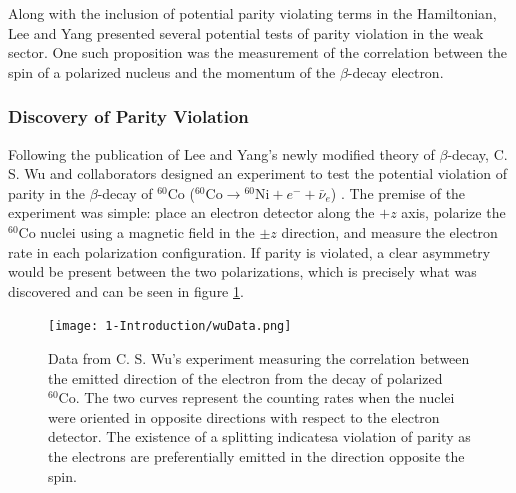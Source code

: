 Along with the inclusion of potential parity violating terms in the Hamiltonian, Lee and Yang
presented several potential tests of parity violation in the weak sector. One such proposition
was the measurement of the correlation between the spin of a polarized nucleus and
the momentum of the $\beta$-decay electron.

\subsubsection{Discovery of Parity Violation}

Following the publication of Lee and Yang's newly modified theory of $\beta$-decay, C. S. Wu
and collaborators designed an experiment to test the potential violation
of parity in the $\beta$-decay of $^{60}\mathrm{Co}$
($^{60}\mathrm{Co} \rightarrow {^{60}\mathrm{Ni}} + e^- + \bar{\nu}_e$) \cite{wu1957}. The premise of the experiment
was simple: place an electron detector along the $+z$ axis, polarize the $^{60}\mathrm{Co}$ nuclei
using a magnetic field in the $\pm z$ direction, and measure the electron rate in each polarization
configuration. If parity is violated, a clear asymmetry would be present between the two polarizations,
which is precisely what was discovered and can be seen in figure \ref{fig:wuData}.

\begin{figure}[h]
  \centering
  \texttt{[image: 1-Introduction/wuData.png]}  
  \caption{Data from C. S. Wu's experiment measuring the correlation between the emitted
    direction of the electron from the decay of polarized $^{60}\mathrm{Co}$. The two
    curves represent the counting rates when the nuclei were oriented in opposite
    directions with respect to the electron detector. The existence of a splitting
    indicatesa violation of parity as the electrons are preferentially emitted in the
    direction opposite the spin.}
  \label{fig:wuData}
\end{figure}

